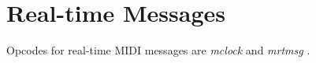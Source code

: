 \begin{comment}
\documentclass[10pt]{article}
\usepackage{fullpage, graphicx, url}
\setlength{\parskip}{1ex}
\setlength{\parindent}{0ex}
\title{Real-time Messages}



\begin{tabular}{ccc}
The Alternative Csound Reference Manual & & \\
Previous &MIDI Support &Next

\end{tabular}

\end{comment}
\section{Real-time Messages}


  Opcodes for real-time MIDI messages are \emph{mclock}
 and \emph{mrtmsg}
. 


\begin{comment}
\begin{tabular}{lcr}
Previous &Home &Next \\
MIDI Message Output &Up &Slider Banks

\end{tabular}



\end{comment}
